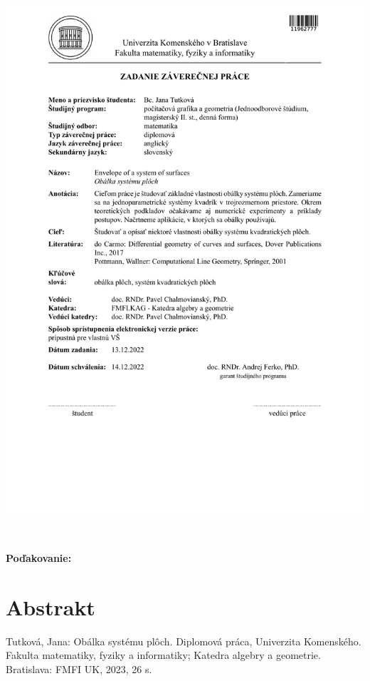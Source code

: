 \documentclass[12pt, twoside]{book}
\theoremstyle{definition}
\begin{document}
\newpage 
\thispagestyle{empty}
\hspace{-2cm}\includegraphics[width=1.1\textwidth]{images/zadanieJT.pdf}


\frontmatter

\setcounter{page}{3}
\newpage 
~

\vfill
{\bf Poďakovanie:}


\newpage 
\section*{Abstrakt}
Tutková, Jana: Obálka systému plôch. Diplomová práca, Univerzita Komenského. Fakulta matematiky, fyziky a informatiky; Katedra algebry a geometrie. Bratislava: FMFI UK, 2023, 26 s.
\end{document}
